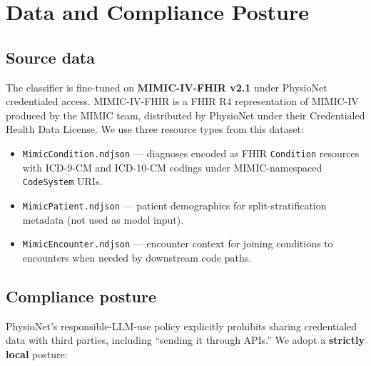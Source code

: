 \section{Data and Compliance Posture}\label{data-and-compliance-posture}

\subsection{Source data}\label{source-data}

The classifier is fine-tuned on \textbf{MIMIC-IV-FHIR v2.1}
\autocite{Bennett2024,Bennett2023,Johnson2023} under PhysioNet
credentialed access. MIMIC-IV-FHIR is a FHIR R4 representation of
MIMIC-IV produced by the MIMIC team, distributed by PhysioNet under
their Credentialed Health Data License. We use three resource
types from this dataset:

\begin{itemize}
\tightlist
\item
  \texttt{MimicCondition.ndjson} --- diagnoses encoded as FHIR \texttt{Condition}
  resources with ICD-9-CM and ICD-10-CM codings under
  MIMIC-namespaced \texttt{CodeSystem} URIs.
\item
  \texttt{MimicPatient.ndjson} --- patient demographics for split-stratification
  metadata (not used as model input).
\item
  \texttt{MimicEncounter.ndjson} --- encounter context for joining conditions
  to encounters when needed by downstream code paths.
\end{itemize}

\subsection{Compliance posture}\label{compliance-posture}

PhysioNet's responsible-LLM-use policy \autocite{PhysioNet2025} explicitly
prohibits sharing credentialed data with third parties, including
``sending it through APIs.'' We adopt a \textbf{strictly local} posture:

